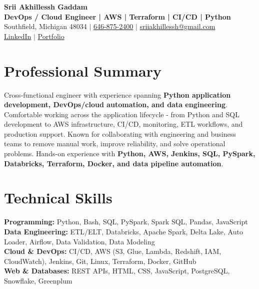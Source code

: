 \documentclass[letterpaper,10pt]{article}
\begin{document}
\fontsize{9.35pt}{10.45pt}\selectfont

\begin{center}
    {\LARGE \textbf{Srii Akhillessh Gaddam}} \\[-1pt]
    \textbf{DevOps / Cloud Engineer | AWS | Terraform | CI/CD | Python} \\[2pt]
    Southfield, Michigan 48034 $|$
    \href{tel:6468752400}{646-875-2400} $|$
    \href{mailto:sriiakhillessh@gmail.com}{sriiakhillessh@gmail.com} \\[1pt]
    \href{https://www.linkedin.com/in/srii-akhiilessh-gaddam-b48668191/}{LinkedIn} $|$
    \href{https://sriiakhillesshg.github.io/portfolio/}{Portfolio}
\end{center}
\vspace{-8pt}

\section{Professional Summary}
\small{Cross-functional engineer with experience spanning \textbf{Python application development, DevOps/cloud automation, and data engineering}. Comfortable working across the application lifecycle - from Python and SQL development to AWS infrastructure, CI/CD, monitoring, ETL workflows, and production support. Known for collaborating with engineering and business teams to remove manual work, improve reliability, and solve operational problems. Hands-on experience with \textbf{Python, AWS, Jenkins, SQL, PySpark, Databricks, Terraform, Docker, and data pipeline automation}.}

\section{Technical Skills}
\small{
\textbf{Programming:} Python, Bash, SQL, PySpark, Spark SQL, Pandas, JavaScript \\
\textbf{Data Engineering:} ETL/ELT, Databricks, Apache Spark, Delta Lake, Auto Loader, Airflow, Data Validation, Data Modeling \\
\textbf{Cloud \& DevOps:} CI/CD, AWS (S3, Glue, Lambda, Redshift, IAM, CloudWatch), Jenkins, Git, Linux, Terraform, Docker, GitHub \\
\textbf{Web \& Databases:} REST APIs, HTML, CSS, JavaScript, PostgreSQL, Snowflake, Greenplum
}
\end{document}
